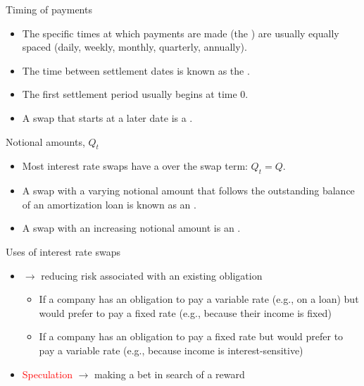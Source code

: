 \documentclass{beamer}
\begin{document}
\begin{frame}{Timing of payments}

\begin{itemize}
\item The specific times at which payments are made (the ) are usually equally spaced (daily, weekly, monthly, quarterly, annually).
\item The time between settlement dates is known as the .
\item The first settlement period usually begins at time 0.
\item A swap that starts at a later date is a .
\end{itemize}

\end{frame}

\begin{frame}{Notional amounts, $Q_t$}

\begin{itemize}
\item Most interest rate swaps have a  over the swap term: $Q_t = Q$.
\medskip
\item A swap with a varying notional amount that follows the outstanding balance of an amortization loan is known as an .
\medskip
\item A swap with an increasing notional amount is an .
\end{itemize}

\end{frame}

\begin{frame}{Uses of interest rate swaps}

\begin{itemize}
\item {} $\rightarrow$ reducing risk associated with an existing obligation
  \begin{itemize}
  \item If a company has an obligation to pay a variable rate (e.g., on a loan) but would prefer to pay a fixed rate (e.g., because their income is fixed)
  \item If a company has an obligation to pay a fixed rate but would prefer to pay a variable rate (e.g., because income is interest-sensitive)
  \end{itemize}
\item \textcolor{red}{Speculation} $\rightarrow$ making a bet in search of a reward
\end{itemize}

\end{frame}
\end{document}
